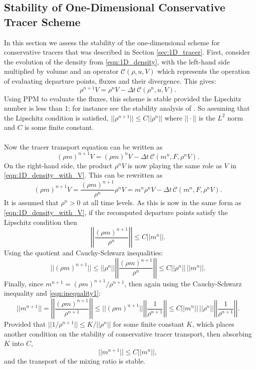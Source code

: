 \documentclass[11pt,a4paper]{article}
\begin{document}
\subsection{Stability of One-Dimensional Conservative Tracer Scheme}
In this section we assess the stability of the one-dimensional scheme for conservative tracers that was described in Section \ref{sec:1D_tracer}.
First, consider the evolution of the density from \eqref{eqn:1D_density}, with the left-hand side multiplied by volume and an operator $\mathcal{C}(\rho,u,V)$ which represents the operation of evaluating departure points, fluxes and their divergence.
This gives:
\begin{equation} \label{eqn:1D_density_with_V}
\rho^{n+1} V = \rho^n V - \Delta t \, \mathcal{C}(\rho^n,u, V).
\end{equation}
Using PPM to evaluate the fluxes, this scheme is stable provided the Lipschitz number is less than $1$; for instance see the stability analysis of \citet{lauritzen2007fvstab}.
So assuming that the Lipschitz condition is satisfied, $||\rho^{n+1}||\leq C||\rho^n||$ where $||\cdot||$ is the $L^2$ norm and $C$ is some finite constant. \\
\\
Now the tracer transport equation can be written as
\begin{equation}
(\rho m)^{n+1} V = (\rho m)^n V - \Delta t \, \mathcal{C}(m^n,F,\rho^n V).
\end{equation}
On the right-hand side, the product $\rho^n V$ is now playing the same role as $V$ in \eqref{eqn:1D_density_with_V}.
This can be rewritten as
\begin{equation}
(\rho m)^{n+1} V = \frac{(\rho m)^{n+1}}{\rho^n} \rho^n V = m^n \rho^n V - \Delta t \, \mathcal{C}(m^n,F,\rho^n V).
\end{equation}
It is assumed that $\rho^{n}>0$ at all time levels.
As this is now in the same form as \eqref{eqn:1D_density_with_V}, if the recomputed departure points satisfy the Lipschitz condition then
\begin{equation}
\left|\left|\frac{(\rho m)^{n+1}}{\rho^n}\right|\right| \leq C||m^n||.
\end{equation}
Using the quotient and Cauchy-Schwarz inequalities:
\begin{equation} \label{eqn:inequality1}
||(\rho m)^{n+1}|| \leq ||\rho^n|| \left|\left|\frac{(\rho m)^{n+1}}{\rho^n}\right|\right| \leq C||\rho^n|| \,||m^n||.
\end{equation}
Finally, since $m^{n+1} = (\rho m)^{n+1} / \rho^{n+1}$, then again using the Cauchy-Schwarz inequality and \eqref{eqn:inequality1}:
\begin{equation}
||m^{n+1}|| = \left|\left|\frac{(\rho m)^{n+1}}{\rho^{n+1}}\right|\right| \leq ||(\rho m)^{n+1}|| \left|\left|\frac{1}{\rho^{n+1}}\right|\right| \leq C ||m^n|| \, ||\rho^n|| \left|\left|\frac{1}{\rho^{n+1}}\right|\right|.
\end{equation}
Provided that $||1/\rho^{n+1}||\leq K/||\rho^n||$ for some finite constant $K$, which places another condition on the stability of conservative tracer transport, then absorbing $K$ into $C$,
\begin{equation}
||m^{n+1}||\leq C ||m^n||,
\end{equation}
and the transport of the mixing ratio is stable.
\end{document}
